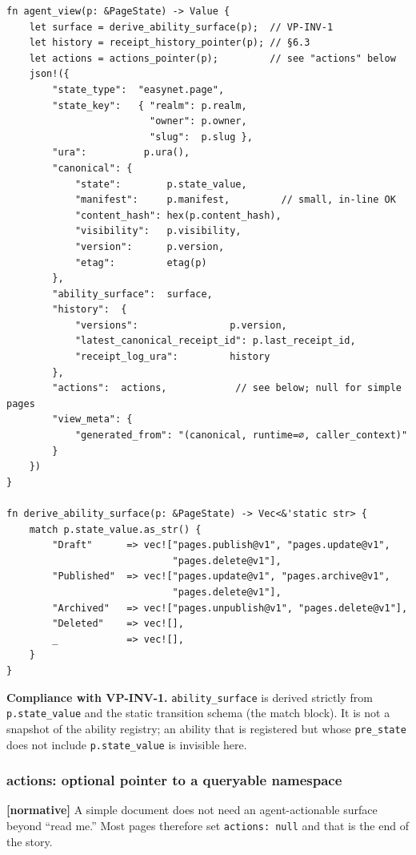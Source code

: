 \documentclass[11pt,a4paper]{article}
\newcommand{\normsv}{\textcolor{normativecolor}{\textbf{[normative]}}\xspace}
\theoremstyle{definition}
\begin{document}
\begin{lstlisting}
fn agent_view(p: &PageState) -> Value {
    let surface = derive_ability_surface(p);  // VP-INV-1
    let history = receipt_history_pointer(p); // §6.3
    let actions = actions_pointer(p);         // see "actions" below
    json!({
        "state_type":  "easynet.page",
        "state_key":   { "realm": p.realm,
                         "owner": p.owner,
                         "slug":  p.slug },
        "ura":          p.ura(),
        "canonical": {
            "state":        p.state_value,
            "manifest":     p.manifest,         // small, in-line OK
            "content_hash": hex(p.content_hash),
            "visibility":   p.visibility,
            "version":      p.version,
            "etag":         etag(p)
        },
        "ability_surface":  surface,
        "history":  {
            "versions":                p.version,
            "latest_canonical_receipt_id": p.last_receipt_id,
            "receipt_log_ura":         history
        },
        "actions":  actions,            // see below; null for simple pages
        "view_meta": {
            "generated_from": "(canonical, runtime=∅, caller_context)"
        }
    })
}

fn derive_ability_surface(p: &PageState) -> Vec<&'static str> {
    match p.state_value.as_str() {
        "Draft"      => vec!["pages.publish@v1", "pages.update@v1",
                             "pages.delete@v1"],
        "Published"  => vec!["pages.update@v1", "pages.archive@v1",
                             "pages.delete@v1"],
        "Archived"   => vec!["pages.unpublish@v1", "pages.delete@v1"],
        "Deleted"    => vec![],
        _            => vec![],
    }
}
\end{lstlisting}

\textbf{Compliance with VP-INV-1.} \texttt{ability\_surface} is
derived strictly from \texttt{p.state\_value} and the static
transition schema (the match block). It is not a snapshot of the
ability registry; an ability that is registered but whose
\texttt{pre\_state} does not include \texttt{p.state\_value} is
invisible here.

\subsubsection{actions: optional pointer to a queryable namespace}

\normsv{} A simple document does not need an agent-actionable
surface beyond ``read me.'' Most pages therefore set
\texttt{actions: null} and that is the end of the story.
\end{document}
